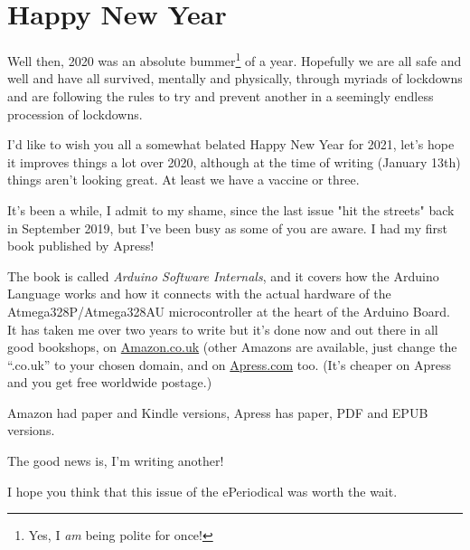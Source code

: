 \chapter{Happy New Year}

Well then, 2020 was an absolute bummer\footnote{Yes, I \emph{am} being polite for once!} of a year. Hopefully we are all safe and well and have all survived, mentally and physically, through myriads of lockdowns and are following the rules to try and prevent another in a seemingly endless procession of lockdowns.

I'd like to wish you all a somewhat belated Happy New Year for 2021, let's hope it improves things a lot over 2020, although at the time of writing (January 13th) things aren't looking great. At least we have a vaccine or three.

It's been a while, I admit to my shame, since the last issue "hit the streets" back in September 2019, but I've been busy as some of you are aware. I had my first book published by Apress!

The book is called \emph{Arduino Software Internals}, and it covers how the Arduino Language works and how it connects with  the actual hardware of the Atmega328P/Atmega328AU microcontroller at the heart of the Arduino Board. It has taken me over two years to write but it's done now and out there in all good bookshops, on \href{https://www.amazon.co.uk/Arduino-Software-Internals-Complete-Language/dp/1484257898/ref=sr_1_1}{Amazon.co.uk} (other Amazons are available, just change the ``.co.uk'' to your chosen domain, and on \href{https://www.apress.com/gb/book/9781484257890}{Apress.com} too. (It's cheaper on Apress and you get free worldwide postage.)

Amazon had paper and Kindle versions, Apress has paper, PDF and EPUB versions.

The good news is, I'm writing another!

I hope you think that this issue of the ePeriodical was worth the wait.


